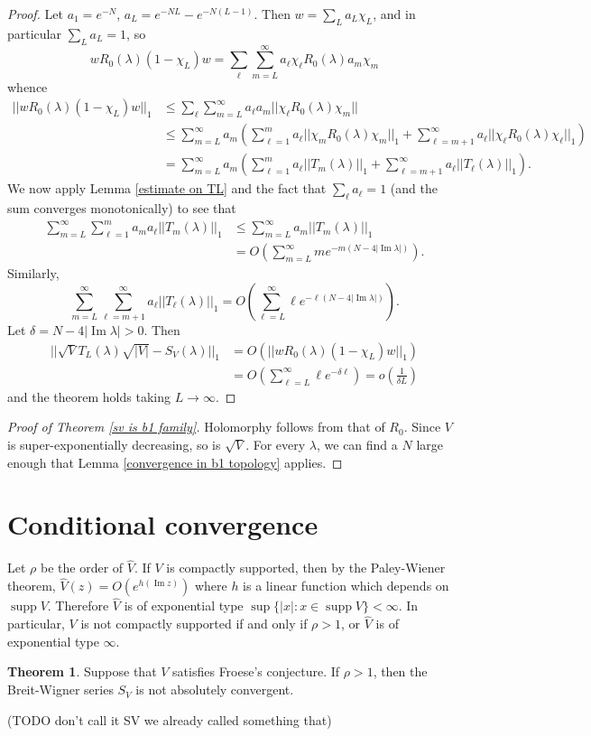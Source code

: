 \documentclass[12pt]{report}
\DeclareMathOperator{\supp}{supp}
\renewcommand{\Im}{\operatorname{Im}}
\theoremstyle{definition}
\newtheorem{theorem}{Theorem}[chapter]
\begin{document}
\begin{proof}
Let $a_1 = e^{-N}$, $a_L = e^{-NL} - e^{-N(L-1)}$. Then $w = \sum_L a_L \chi_L$, and in particular $\sum_L a_L = 1$, so
$$wR_0(\lambda)(1 - \chi_L)w = \sum_\ell \sum_{m=L}^\infty a_\ell\chi_\ell R_0(\lambda) a_m \chi_m$$
whence
\begin{align*}
  ||wR_0(\lambda)(1 - \chi_L)w||_1 &\leq \sum_\ell \sum_{m=L}^\infty a_\ell a_m ||\chi_\ell R_0(\lambda) \chi_m||\\
  &\leq \sum_{m=L}^\infty a_m \left(\sum_{\ell=1}^m a_\ell ||\chi_m R_0(\lambda) \chi_m||_1 + \sum_{\ell=m+1}^\infty a_\ell ||\chi_\ell R_0(\lambda) \chi_\ell||_1 \right)\\
  &= \sum_{m=L}^\infty a_m \left(\sum_{\ell=1}^m a_\ell ||T_m(\lambda)||_1 + \sum_{\ell=m+1}^\infty a_\ell ||T_\ell(\lambda)||_1 \right).
\end{align*}
We now apply Lemma \ref{estimate on TL} and the fact that $\sum_\ell a_\ell = 1$ (and the sum converges monotonically) to see that
\begin{align*}
  \sum_{m=L}^\infty\sum_{\ell=1}^m a_m a_\ell ||T_m(\lambda)||_1 &\leq \sum_{m=L}^\infty a_m ||T_m(\lambda)||_1\\
  &= O\left(\sum_{m=L}^\infty me^{-m(N-4|\Im \lambda|)}\right).
\end{align*}
Similarly,
$$\sum_{m=L}^\infty \sum_{\ell=m+1}^\infty a_\ell ||T_\ell(\lambda)||_1 = O\left(\sum_{\ell=L}^\infty \ell e^{-\ell(N-4|\Im \lambda|)}\right).$$
Let $\delta = N - 4|\Im \lambda| > 0$. Then
\begin{align*}
  ||\sqrt V T_L(\lambda) \sqrt{|V|} - S_V(\lambda)||_1 &= O(||wR_0(\lambda)(1 - \chi_L)w||_1) \\
  &= O\left(\sum_{\ell=L}^\infty \ell e^{-\delta \ell} \right) = o\left(\frac{1}{\delta L}\right)
\end{align*}
and the theorem holds taking $L \to \infty$.
\end{proof}

\begin{proof}[Proof of Theorem \ref{sv is b1 family}]
Holomorphy follows from that of $R_0$. Since $V$ is super-exponentially decreasing, so is $\sqrt V$. For every $\lambda$, we can find a $N$ large enough that Lemma \ref{convergence in b1 topology} applies.
\end{proof}

\section{Conditional convergence}
Let $\rho$ be the order of $\hat V$. If $V$ is compactly supported, then by the Paley-Wiener theorem, $\hat V(z) = O(e^{h(\Im z)})$ where $h$ is a linear function which depends on $\supp V$. Therefore $\hat V$ is of exponential type $\sup\{|x|: x \in \supp V\} < \infty$. In particular, $V$ is not compactly supported if and only if $\rho > 1$, or $\hat V$ is of exponential type $\infty$.
\begin{theorem}
  \label{conditional convergence of breit wigner}
Suppose that $V$ satisfies Froese's conjecture. If $\rho > 1$, then the Breit-Wigner series $S_V$ is not absolutely convergent.
\end{theorem}
(TODO don't call it SV we already called something that)
\end{document}
